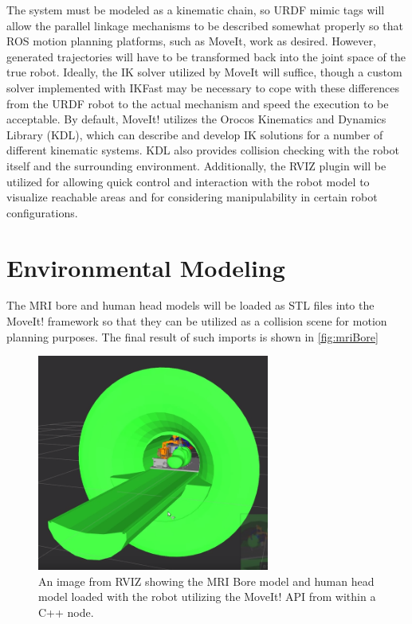 \documentclass[12pt]{report}
\begin{document}
The system must be modeled as a kinematic chain, so URDF mimic tags will allow the parallel linkage mechanisms to be described somewhat properly so that ROS motion planning platforms, such as MoveIt, work as desired. However, generated trajectories will have to be transformed back into the joint space of the true robot. Ideally, the IK solver utilized by MoveIt will suffice, though a custom solver implemented with IKFast may be necessary to cope with these differences from the URDF robot to the actual mechanism and speed the execution to be acceptable. \cite{ikFastMoveIt} By default, MoveIt! utilizes the Orocos Kinematics and Dynamics Library (KDL), which can describe and develop IK solutions for a number of different kinematic systems. \cite{orocosKDL} KDL also provides collision checking with the robot itself and the surrounding environment. Additionally, the RVIZ plugin will be utilized for allowing quick control and interaction with the robot model to visualize reachable areas and for considering manipulability in certain robot configurations.

\section{Environmental Modeling}
The MRI bore and human head models will be loaded as STL files into the MoveIt! framework so that they can be utilized as a collision scene for motion planning purposes. The final result of such imports is shown in \autoref{fig:mriBore}

\begin{figure}[thpb]
	\centering
	\includegraphics[width = 3in]{images/mri_bore_and_head.png}
    \caption{An image from RVIZ showing the MRI Bore model and human head model loaded with the robot utilizing the MoveIt! API from within a C++ node.}
    \label{fig:mriBore}
\end{figure}
\end{document}
